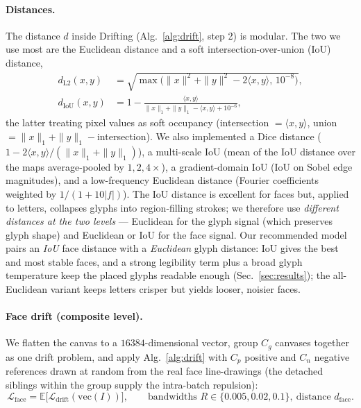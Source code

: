 \documentclass{article}
\begin{document}
\paragraph{Distances.}
\label{sec:kernels}
The distance $d$ inside Drifting (Alg.~\ref{alg:drift}, step 2) is modular. The two we use most are the
Euclidean distance and a soft intersection-over-union (IoU) distance,
\begin{align}
   d_{\mathrm{L2}}(x,y)&=\sqrt{\max\!\big(\|x\|^2+\|y\|^2-2\langle x,y\rangle,\,10^{-8}\big)},\\
   d_{\mathrm{IoU}}(x,y)&=1-\frac{\langle x,y\rangle}{\|x\|_1+\|y\|_1-\langle x,y\rangle+10^{-6}},
\end{align}
the latter treating pixel values as soft occupancy (intersection $=\langle x,y\rangle$, union
$=\|x\|_1{+}\|y\|_1{-}$intersection). We also implemented a Dice distance
($1{-}2\langle x,y\rangle/(\|x\|_1{+}\|y\|_1)$), a multi-scale IoU (mean of the IoU distance over the
maps average-pooled by $1,2,4\times$), a gradient-domain IoU (IoU on Sobel edge magnitudes), and a
low-frequency Euclidean distance (Fourier coefficients weighted by $1/(1{+}10|f|)$). The IoU distance
is excellent for faces but, applied to letters, collapses glyphs into region-filling strokes; we
therefore use \emph{different distances at the two levels} --- Euclidean for the glyph signal (which
preserves glyph shape) and Euclidean or IoU for the face signal. Our recommended model pairs an
\emph{IoU} face distance with a \emph{Euclidean} glyph distance: IoU gives the best and most stable
faces, and a strong legibility term plus a broad glyph temperature keep the placed glyphs readable
enough (Sec.~\ref{sec:results}); the all-Euclidean variant keeps letters crisper but yields looser,
noisier faces.

\paragraph{Face drift (composite level).} We flatten the canvas to a $16384$-dimensional vector, group
$C_g$ canvases together as one drift problem, and apply Alg.~\ref{alg:drift} with $C_p$ positive and
$C_n$ negative references drawn at random from the real face line-drawings (the detached siblings
within the group supply the intra-batch repulsion):
\begin{equation}
   \mathcal{L}_{\mathrm{face}} = \mathbb{E}\big[\mathcal{L}_{\mathrm{drift}}(\mathrm{vec}(I))\big],
   \qquad \text{bandwidths } R\in\{0.005,0.02,0.1\},\ \text{distance } d_{\mathrm{face}}.
\end{equation}
\end{document}
